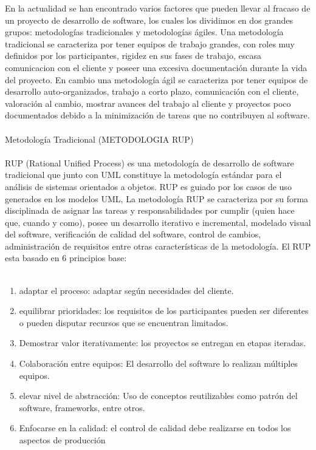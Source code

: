 \documentclass[10pt,a4paper]{article}
\begin{document}
En la actualidad se han encontrado varios factores que pueden llevar al fracaso
 de un proyecto de desarrollo de software, los cuales los dividimos en dos grandes
  grupos: metodolog\' ias
   tradicionales y metodolog\' ias \' agiles. Una metodolog\' ia tradicional 
   se caracteriza por tener equipos de trabajo grandes, con roles muy definidos 
   por los participantes, rigidez en sus fases de trabajo, escasa comunicacion 
   con el cliente y poseer una excesiva documentaci\' on durante la vida del proyecto.
    En cambio una metodolog\' ia \' agil se caracteriza por tener equipos de desarrollo 
    auto-organizados, trabajo a corto plazo, comunicaci\' on con el cliente, valoraci\' on 
    al cambio, mostrar avances del trabajo al cliente y proyectos
     poco documentados debido a la minimizaci\' on de tareas que no contribuyen al software. \\\\
Metodolog\' ia Tradicional (METODOLOGIA RUP)\\\\ %
RUP (Rational Unified Process) es una metodolog\' ia de desarrollo de software 
tradicional que junto con UML constituye la metodolog\' ia est\' andar 
para el an\' alisis de sistemas orientados a objetos. RUP es guiado
 por los casos de uso generados en 
los modelos UML,  La metodolog\' ia RUP se caracteriza por su forma 
disciplinada de asignar las tareas y responsabilidades por cumplir 
(quien hace que, cuando y como), posee un desarrollo iterativo e incremental, 
modelado visual del software, verificaci\' on de calidad del software, control de 
cambios, administraci\' on de requisitos entre otras caracter\' isticas de la metodolog\' ia. 
El RUP esta basado en 6 principios base:\\\
\begin{enumerate}
\item adaptar el proceso: adaptar seg\' un necesidades del cliente.
\item equilibrar prioridades: los requisitos de los participantes
 pueden ser diferentes o pueden disputar recursos que se encuentran limitados. 
\item Demostrar valor iterativamente: los proyectos se entregan 
en etapas iteradas. 
\item Colaboraci\' on entre equipos: El desarrollo del software
 lo realizan m\' ultiples equipos. 
\item elevar nivel de abstracci\' on: Uso de conceptos reutilizables
 como patr\' on del software, frameworks, entre otros. 
\item Enfocarse en la calidad: el control de calidad debe 
realizarse en todos los aspectos de producci\' on\\\\

\end{enumerate}
\end{document}
